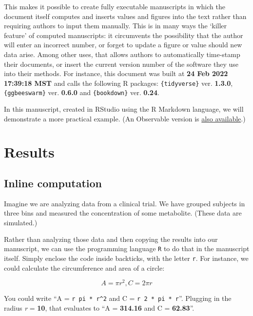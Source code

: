 \documentclass[smallextended]{svjour3}       %
\begin{document}
This makes it possible to create fully executable manuscripts in which the document itself computes and inserts values and figures into the text rather than requiring authors to input them manually. This is in many ways the `killer feature' of computed manuscripts: it circumvents the possibility that the author will enter an incorrect number, or forget to update a figure or value should new data arise. Among other uses, that allows authors to automatically time-stamp their documents, or insert the current version number of the software they use into their methods. For instance, this document was built at \textbf{24 Feb 2022 17:39:18 MST} and calls the following R packages: \texttt{\{tidyverse\}} ver. \textbf{1.3.0}, \texttt{\{ggbeeswarm\}} ver. \textbf{0.6.0} and \texttt{\{bookdown\}} ver. \textbf{0.24}.

In this manuscript, created in RStudio using the R Markdown language, we will demonstrate a more practical example. (An Observable version is \href{https://observablehq.com/@jperkel/example-executable-observable-notebook}{also available}.)

\hypertarget{results}{%
\section{Results}\label{results}}

\hypertarget{sec:1}{%
\subsection{Inline computation}\label{sec:1}}

Imagine we are analyzing data from a clinical trial. We have grouped subjects in three bins and measured the concentration of some metabolite. (These data are simulated.)

Rather than analyzing those data and then copying the results into our manuscript, we can use the programming language \texttt{R} to do that in the manuscript itself. Simply enclose the code inside backticks, with the letter \texttt{r}. For instance, we could calculate the circumference and area of a circle:

\[A = \pi r^2, C = 2 \pi r\]

You could write ``A = \texttt{\textasciigrave{}r\ pi\ *\ r\^{}2\textasciigrave{}} and C = \texttt{\textasciigrave{}r\ 2\ *\ pi\ *\ r\textasciigrave{}}''. Plugging in the radius \emph{r} = \textbf{10}, that evaluates to ``A = \textbf{314.16} and C = \textbf{62.83}''.
\end{document}
